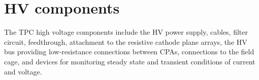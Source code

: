 




\section{HV components}

The TPC high voltage components include the HV power supply, cables,
filter circuit, feedthrough, attachment to the resistive cathode plane
arrays, the HV bus providing low-resistance connections between CPAs,
connections to the field cage, and devices for monitoring steady state
and transient conditions of current and voltage.

